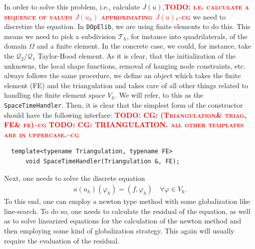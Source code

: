 \documentclass[prodmode,acmtoms]{acmsmall}
\numberwithin{equation}{section}
\renewcommand{\phi}{\varphi}
\newcommand{\dope}{\texttt{DOpElib}}
\newcommand{\todocg}[1]{\textbf{\textsc{\textcolor{red}{TODO: #1\textasciitilde cg}}}}
\begin{document}
In order to solve this problem, i.e., calculate $J(u)$,\todocg{i.e. calculate a sequence of values $J(u_h)$ approximating $J(u)$,} we need to discretize 
the equation. In \dope, we are using finite elements to do this. This means we need to pick a 
subdivision $\mathcal T_h$, for instance into quadrilaterals,
of the domain $\Omega$ and a finite element. In the concrete case, we could, 
for instance, take the $\mathcal Q_2/\mathcal Q_1$ Taylor-Hood element.
As it is clear, that the initialization of the unknowns, the local shape 
functions, removal of hanging node constraints, etc. always follows the 
same procedure, we define an object which takes the finite element (FE)
and the triangulation and takes care of all other things related to
handling the finite element space $V_h$. We will refer, to 
this as the \texttt{SpaceTimeHandler}. Then, it is clear that the simplest 
form of the constructor should have the following interface:
\todocg{CG: (Triangulation\& triag, FE\& fe)}
\todocg{CG: TRIANGULATION. all other templates are in uppercase.}
\begin{lstlisting}
  template<typename Triangulation, typename FE>
      void SpaceTimeHandler(Triangulation &, FE);
\end{lstlisting}
Next, one needs to solve the discrete equation
\begin{align}\label{eq:discrete_equation}
a(u_h)(\phi_h) = (f,\phi_h) \quad \forall \phi \in V_h.
\end{align}
To this end, one can employ a newton type method with some globalization 
like line-search. To do so, one needs to calculate the residual of the 
equation, as well as to solve linearized equations for the calculation of 
the newton method and then employing some kind of globalization strategy.
This again will usually require the evaluation of the residual.
\end{document}
